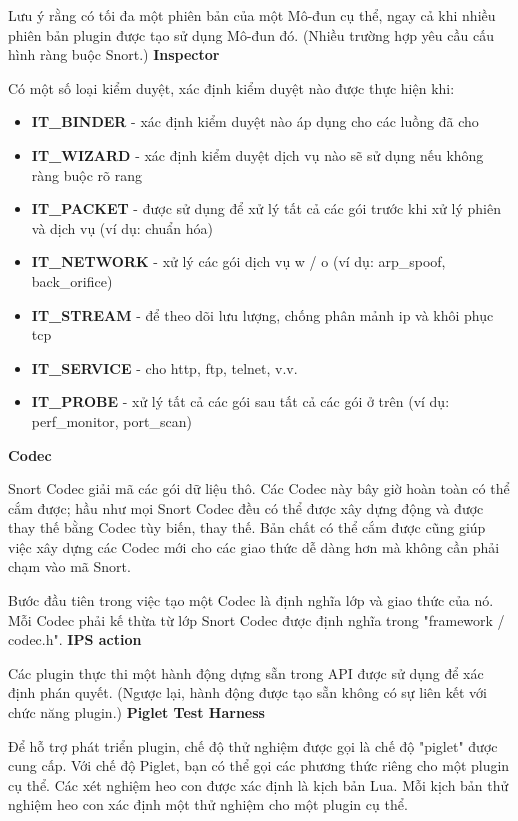 \par
Lưu ý rằng có tối đa một phiên bản của một Mô-đun cụ thể, ngay cả khi nhiều phiên bản plugin được tạo sử dụng Mô-đun đó. (Nhiều trường hợp yêu cầu cấu hình ràng buộc Snort.)
\newline
\newline
\textbf{Inspector}
\par
Có một số loại kiểm duyệt, xác định kiểm duyệt nào được thực hiện khi:
\begin{itemize}
\item \textbf{IT\_BINDER} - xác định kiểm duyệt nào áp dụng cho các luồng đã cho
\item \textbf{IT\_WIZARD} - xác định kiểm duyệt dịch vụ nào sẽ sử dụng nếu không ràng buộc rõ rang
\item \textbf{IT\_PACKET} - được sử dụng để xử lý tất cả các gói trước khi xử lý phiên và dịch vụ (ví dụ: chuẩn hóa)
\item \textbf{IT\_NETWORK} - xử lý các gói dịch vụ w / o (ví dụ: arp\_spoof, back\_orifice)
\item \textbf{IT\_STREAM} - để theo dõi lưu lượng, chống phân mảnh ip và khôi phục tcp
\item \textbf{IT\_SERVICE} - cho http, ftp, telnet, v.v.
\item \textbf{IT\_PROBE} - xử lý tất cả các gói sau tất cả các gói ở trên (ví dụ: perf\_monitor, port\_scan)
\end{itemize}
\textbf{Codec}
\par
Snort Codec giải mã các gói dữ liệu thô. Các Codec này bây giờ hoàn toàn có thể cắm được; hầu như mọi Snort Codec đều có thể được xây dựng động và được thay thế bằng Codec tùy biến, thay thế. Bản chất có thể cắm được cũng giúp việc xây dựng các Codec mới cho các giao thức dễ dàng hơn mà không cần phải chạm vào mã Snort.
\par
Bước đầu tiên trong việc tạo một Codec là định nghĩa lớp và giao thức của nó. Mỗi Codec phải kế thừa từ lớp Snort Codec được định nghĩa trong "framework / codec.h".
\newline
\newline
\textbf{IPS action}
\par
Các plugin thực thi một hành động dựng sẵn trong API được sử dụng để xác định phán quyết. (Ngược lại, hành động được tạo sẵn không có sự liên kết với chức năng plugin.)
\newline
\newline
\textbf{Piglet Test Harness}
\par
Để hỗ trợ phát triển plugin, chế độ thử nghiệm được gọi là chế độ "piglet" được cung cấp. 
Với chế độ Piglet, bạn có thể gọi các phương thức riêng cho một plugin cụ thể. 
Các xét nghiệm heo con được xác định là kịch bản Lua. 
Mỗi kịch bản thử nghiệm heo con xác định một thử nghiệm cho một plugin cụ thể.